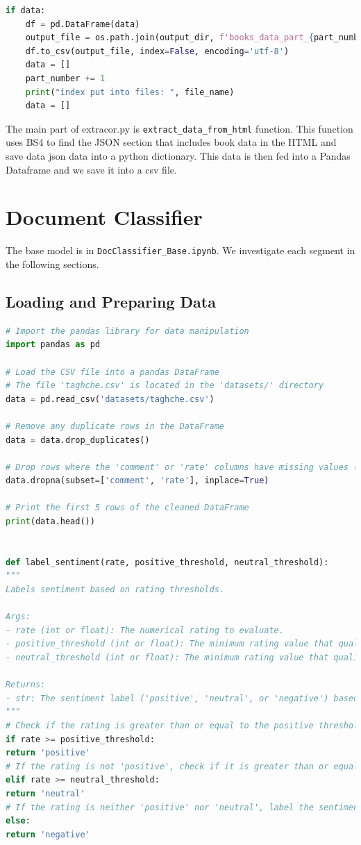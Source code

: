 \documentclass{solutionclass} %
\def\co#1{\texttt{#1}}
\begin{document}
\begin{lstlisting}[language=Python]
if data:
    df = pd.DataFrame(data)
    output_file = os.path.join(output_dir, f'books_data_part_{part_number}.csv')
    df.to_csv(output_file, index=False, encoding='utf-8')
    data = []
    part_number += 1
    print("index put into files: ", file_name)
    data = []
\end{lstlisting}

\begin{solution}
The main part of extracor.py is \co{extract\_data\_from\_html} function. This function uses BS4 to find the JSON section that includes book data in the HTML and save data json data into a python dictionary. This data is then fed into a Pandas Dataframe and we save it into a csv file.


\end{solution}

\section{Document Classifier}

The base model is in \co{DocClassifier\_Base.ipynb}. We investigate each segment in the following sections.

\subsection*{Loading and Preparing Data}


\begin{lstlisting}[language=Python]
# Import the pandas library for data manipulation
import pandas as pd

# Load the CSV file into a pandas DataFrame
# The file 'taghche.csv' is located in the 'datasets/' directory
data = pd.read_csv('datasets/taghche.csv')

# Remove any duplicate rows in the DataFrame
data = data.drop_duplicates()

# Drop rows where the 'comment' or 'rate' columns have missing values (NaN)
data.dropna(subset=['comment', 'rate'], inplace=True)

# Print the first 5 rows of the cleaned DataFrame
print(data.head())


def label_sentiment(rate, positive_threshold, neutral_threshold):
"""
Labels sentiment based on rating thresholds.

Args:
- rate (int or float): The numerical rating to evaluate.
- positive_threshold (int or float): The minimum rating value that qualifies as 'positive'.
- neutral_threshold (int or float): The minimum rating value that qualifies as 'neutral'; ratings below this are considered 'negative'.

Returns:
- str: The sentiment label ('positive', 'neutral', or 'negative') based on the rating.
"""
# Check if the rating is greater than or equal to the positive threshold
if rate >= positive_threshold:
return 'positive'
# If the rating is not 'positive', check if it is greater than or equal to the neutral threshold
elif rate >= neutral_threshold:
return 'neutral'
# If the rating is neither 'positive' nor 'neutral', label the sentiment as 'negative'
else:
return 'negative'
\end{lstlisting}
\end{document}
